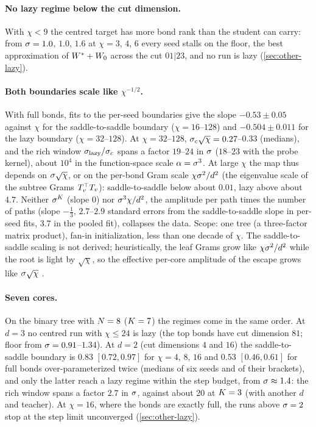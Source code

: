 \paragraph{No lazy regime below the cut dimension.}
\derived{} \empirical{} With $\chi<9$ the centred target has more bond rank than the student can carry: from
$\sigma=1.0$, $1.0$, $1.6$ at $\chi=3$, $4$, $6$ every seed stalls on the floor, the best approximation of $W^{*}+W_{0}$
across the cut $01|23$, and no run is lazy (\cref{sec:other-lazy}).

\paragraph{Both boundaries scale like $\chi^{-1/2}$.}
\empirical{} With full bonds, fits to the per-seed boundaries give the slope $-0.53\pm0.05$ against $\chi$ for the
saddle-to-saddle boundary ($\chi=16$--$128$) and $-0.504\pm0.011$ for the lazy boundary ($\chi=32$--$128$). At
$\chi=32$--$128$, $\sigma_c\sqrt\chi=0.27$--$0.33$ (medians), and the rich window $\sigma_{\rm lazy}/\sigma_c$ spans a factor
$19$--$24$ in $\sigma$ ($18$--$23$ with the probe kernel), about $10^4$ in the function-space scale $\alpha=\sigma^3$.
At large $\chi$ the map thus depends on $\sigma\sqrt\chi$, or on the per-bond Gram scale $\chi\sigma^2/d^2$ (the
eigenvalue scale of the subtree Grams $T_{v}^{\top}T_{v}$): saddle-to-saddle below about $0.01$, lazy above about
$4.7$. Neither $\sigma^K$ (slope $0$) nor $\sigma^3\chi/d^2$, the amplitude per path times the number of paths (slope
$-\frac13$, $2.7$--$2.9$ standard errors from the saddle-to-saddle slope in per-seed fits, $3.7$ in the pooled
fit), collapses the data. Scope: one tree (a
three-factor matrix product), fan-in initialization, less than one decade of $\chi$. The saddle-to-saddle
scaling is not derived; heuristically, the leaf Grams grow like $\chi\sigma^2/d^2$ while the root is light by
$\sqrt\chi$, so the effective per-core amplitude of the escape grows like $\sigma\sqrt\chi$ \conjecture.

\paragraph{Seven cores.}
\empirical{} On the binary tree with $N=8$ ($K=7$) the regimes come in the same order. At $d=3$ no centred run
with $\chi\le24$ is lazy (the top bonds have cut dimension $81$; floor from $\sigma=0.91$--$1.34$). At $d=2$ (cut
dimensions $4$ and $16$) the saddle-to-saddle boundary is $0.83$ $[0.72,0.97]$ for $\chi=4$, $8$, $16$ and $0.53$
$[0.46,0.61]$ for full bonds over-parameterized twice (medians of six seeds and of their brackets), and only the
latter reach a lazy regime within the step budget, from $\sigma\approx1.4$: the rich window spans a factor $2.7$
in $\sigma$, against about 20 at $K=3$ (with another $d$ and teacher). At $\chi=16$, where the bonds are exactly
full, the runs above $\sigma=2$ stop at the step limit unconverged (\cref{sec:other-lazy}).

